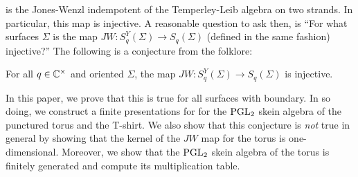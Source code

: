 is the Jones-Wenzl indempotent of the Temperley-Leib algebra
on two strands. In particular, this map is injective.
A reasonable question to ask then, is ``For what surfaces $\Sigma$ 
is the map $JW: S_q^Y(\Sigma) \to S_q(\Sigma)$ (defined in the same fashion)
injective?'' The following is a conjecture from the folklore:

\begin{conjecture*}[Folklore]
    For all $q \in \mathbb{C}^\times$ and oriented $\Sigma$, the map
    $JW: S_q^Y(\Sigma) \to S_q(\Sigma)$ is injective.
\end{conjecture*}

In this paper, we prove that this is true for all surfaces with
boundary. In so doing, we construct a finite presentations for
for the $\mathrm{PGL}_2$ skein algebra of the punctured torus and the
T-shirt. We also show that this conjecture is \emph{not} true 
in general by showing that the kernel of the $JW$ map for the
torus is one-dimensional. Moreover, we show that the $\mathrm{PGL}_2$
skein algebra of the torus is finitely generated and compute its
multiplication table. 